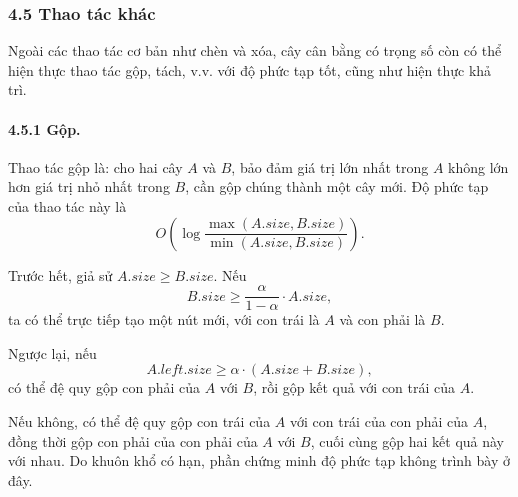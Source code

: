 \documentclass[11pt]{article}
\begin{document}
\begin{center}
\end{center}

\subsubsection*{4.5 Thao tác khác}

Ngoài các thao tác cơ bản như chèn và xóa, cây cân bằng có trọng số còn có thể
hiện thực thao tác gộp, tách, v.v. với độ phức tạp tốt, cũng như hiện thực khả
trì.

\paragraph{4.5.1 Gộp.}
Thao tác gộp là: cho hai cây \(A\) và \(B\), bảo đảm giá trị lớn nhất trong
\(A\) không lớn hơn giá trị nhỏ nhất trong \(B\), cần gộp chúng thành một cây
mới. Độ phức tạp của thao tác này là
\[
  O\left(\log
  \frac{\max(A.\textit{size},B.\textit{size})}
       {\min(A.\textit{size},B.\textit{size})}\right).
\]

Trước hết, giả sử \(A.\textit{size}\ge B.\textit{size}\). Nếu
\[
  B.\textit{size}\ge \frac{\alpha}{1-\alpha}\cdot A.\textit{size},
\]
ta có thể trực tiếp tạo một nút mới, với con trái là \(A\) và con phải là
\(B\).

Ngược lại, nếu
\[
  A.\textit{left}.\textit{size}
  \ge \alpha\cdot(A.\textit{size}+B.\textit{size}),
\]
có thể đệ quy gộp con phải của \(A\) với \(B\), rồi gộp kết quả với con trái
của \(A\).

Nếu không, có thể đệ quy gộp con trái của \(A\) với con trái của con phải của
\(A\), đồng thời gộp con phải của con phải của \(A\) với \(B\), cuối cùng gộp
hai kết quả này với nhau. Do khuôn khổ có hạn, phần chứng minh độ phức tạp
không trình bày ở đây.
\end{document}
